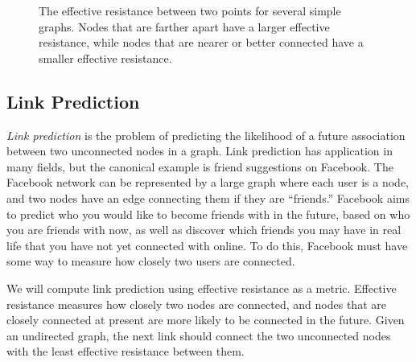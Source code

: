 \begin{center}
\begin{figure}[H]
\caption{The effective resistance between two points for several simple graphs.
Nodes that are farther apart have a larger effective resistance, while nodes that are nearer or better connected have a smaller effective resistance.}
\label{fig:eff-res}
\end{figure}
\end{center}

\subsection*{Link Prediction} %

\emph{Link prediction} is the problem of predicting the likelihood of a future association between two unconnected nodes in a graph.
Link prediction has application in many fields, but the canonical example is friend suggestions on Facebook.
The Facebook network can be represented by a large graph where each user is a node, and two nodes have an edge connecting them if they are ``friends.''
Facebook aims to predict who you would like to become friends with in the future, based on who you are friends with now, as well as discover which friends you may have in real life that you have not yet connected with online.
To do this, Facebook must have some way to measure how closely two users are connected.

We will compute link prediction using effective resistance as a metric.
Effective resistance measures how closely two nodes are connected, and nodes that are closely connected at present are more likely to be connected in the future.
Given an undirected graph, the next link should connect the two unconnected nodes with the least effective resistance between them.

